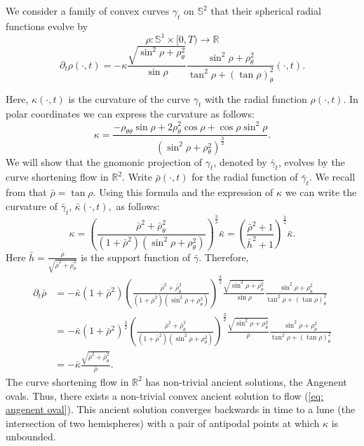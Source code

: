 \documentclass{amsart}
\begin{document}
\begin{example}
We consider a family of convex curves $\gamma_t$ on $\mathbb{S}^2$ that their spherical radial functions evolve by
\[\rho:\mathbb{S}^1\times[0,T)\to \mathbb{R}\]
\begin{equation}\label{eq: angenent oval}
\partial_t\rho(\cdot,t)=-\kappa \frac{\sqrt{\sin^2\rho+\rho_{\theta}^2}}{\sin\rho}\frac{\sin^2\rho+\rho_{\theta}^2}{\tan^2\rho+(\tan\rho)_{\theta}^2}(\cdot,t).
\end{equation}

Here, $\kappa(\cdot,t)$ is the curvature of the curve $\gamma_t$ with the radial function $\rho(\cdot,t).$
In polar coordinates we can express the curvature as follows:
\[\kappa=\frac{-\rho_{\theta\theta}\sin\rho+2\rho_\theta^2\cos\rho+\cos\rho\sin^2\rho}{(\sin^2\rho+\rho_{\theta}^2)^{\frac{3}{2}}}.\]
We will show that the gnomonic projection of $\gamma_t$, denoted by $\bar{\gamma}_t$, evolves by the curve shortening flow in $\mathbb{R}^2.$ Write $\bar{\rho}(\cdot,t)$ for the radial function of $\bar{\gamma}_t$. We recall from \cite[p.~8]{besau2014spherical} that
$\bar{\rho}=\tan\rho.$ Using this formula and the expression of $\kappa$ we can write the curvature of $\bar{\gamma}_t$,  $\bar{\kappa}(\cdot,t),$ as follows:
\[\kappa=\left(\frac{\bar{\rho}^2+\bar{\rho}_{\theta}^2}{(1+\bar{\rho}^2)(\sin^2\rho+\rho_{\theta}^2)}\right)^{\frac{3}{2}}\bar{\kappa}=\left(\frac{\bar{\rho}^2+1}{\bar{h}^2+1}\right)^{\frac{3}{2}}\bar{\kappa}.\]
Here $\bar{h}=\frac{\bar{\rho}}{\sqrt{\bar{\rho}^2+\bar{\rho}_{\theta}^2}}$ is the support function of $\bar{\gamma}.$
Therefore,
\begin{align*}
\partial_t\bar{\rho}&=-\bar{\kappa}(1+\bar{\rho}^2)\left(\frac{\bar{\rho}^2+\bar{\rho}_{\theta}^2}{(1+\bar{\rho}^2)(\sin^2\rho+\rho_{\theta}^2)}\right)^{\frac{3}{2}}\frac{\sqrt{\sin^2\rho+\rho_{\theta}^2}}{\sin\rho}\frac{\sin^2\rho+\rho_{\theta}^2}{\tan^2\rho+(\tan\rho)_{\theta}^2}\\
&=-\bar{\kappa}(1+\bar{\rho}^2)^{\frac{3}{2}}\left(\frac{\bar{\rho}^2+\bar{\rho}_{\theta}^2}{(1+\bar{\rho}^2)(\sin^2\rho+\rho_{\theta}^2)}\right)^{\frac{3}{2}}\frac{\sqrt{\sin^2\rho+\rho_{\theta}^2}}{\bar{\rho}}\frac{\sin^2\rho+\rho_{\theta}^2}{\tan^2\rho+(\tan\rho)_{\theta}^2}\\
&=-\bar{\kappa}\frac{\sqrt{\bar{\rho}^2+\bar{\rho}_{\theta}^2}}{\bar{\rho}}.
\end{align*}
The curve shortening flow in $\mathbb{R}^2$ has non-trivial ancient solutions, the Angenent ovals. Thus, there exists a non-trivial convex ancient solution to flow (\ref{eq: angenent oval}). This ancient solution converges backwards in time to a lune (the intersection of two hemispheres) with a pair of antipodal points at which \(\kappa\) is unbounded.
\end{example}
\end{document}
